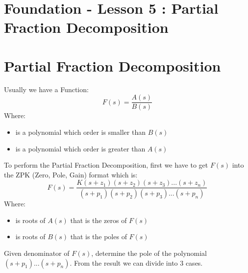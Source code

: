 \documentclass[12pt,a4paper]{article}
\begin{document}
	\section*{\centering Foundation - Lesson 5 : Partial Fraction Decomposition}
	
	
	\section{Partial Fraction Decomposition}
	Usually we have a Function:
	\[
	F(s) = \frac{A(s)}{B(s)}
	\]
	Where:
	\begin{itemize}
		\item { is a polynomial which order is smaller than \(B(s)\)}
		\item { is a polynomial which order is greater than \(A(s)\)}
	\end{itemize}
	To perform the Partial Fraction Decomposition, first we have to get \(F(s)\) into the ZPK (Zero, Pole, Gain) format which is:
	\[
	F(s) = \frac{K (s+z_1)(s+z_2)(s+z_3)...(s+z_n)}{(s+p_1)(s+p_2)(s+p_3)...(s+p_n)}
	\]
	Where:
	\begin{itemize}
		\item { is roots of \(A(s)\) that is the zeros of \(F(s)\)}
		\item { is roots of \(B(s)\) that is the poles of \(F(s)\)}
	\end{itemize}
	Given denominator of \(F(s)\), determine the pole of the polynomial \((s+p_1)...(s+p_n)\). From the result we can divide into 3 cases.
\end{document}
